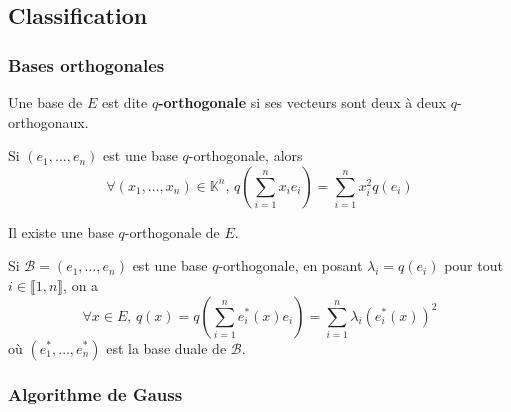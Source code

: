 	\subsection{Classification}
	
	\subsubsection{Bases orthogonales}
	
	
	\begin{definition}
		Une base de $E$ est dite \textbf{$q$-orthogonale} si ses vecteurs sont deux à deux $q$-orthogonaux.
	\end{definition}
	
	\begin{remark}
		Si $(e_1, \dots, e_n)$ est une base $q$-orthogonale, alors
		\[ \forall (x_1, \dots, x_n) \in \mathbb{K}^n, \, q \left( \sum_{i=1}^n x_i e_i \right) = \sum_{i=1}^n x_i^2 q(e_i) \]
	\end{remark}
	
	\begin{theorem}
		Il existe une base $q$-orthogonale de $E$.
	\end{theorem}
	
	\begin{remark}
		Si $\mathcal{B} = (e_1, \dots, e_n)$ est une base $q$-orthogonale, en posant $\lambda_i = q(e_i)$ pour tout $i \in \llbracket 1, n \rrbracket$, on a
		\[ \forall x \in E, \, q(x) = q \left( \sum_{i=1}^n e_i^*(x) e_i \right) = \sum_{i=1}^n \lambda_i (e_i^*(x))^2 \]
		où $(e_1^*, \dots, e_n^*)$ est la base duale de $\mathcal{B}$.
	\end{remark}
	
	\subsubsection{Algorithme de Gauss}
	
